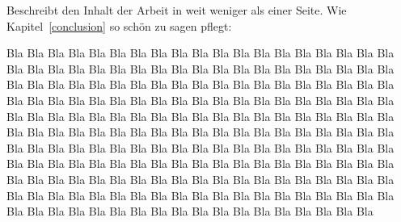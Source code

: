 Beschreibt den Inhalt der Arbeit in weit weniger als einer Seite.
Wie Kapitel~\ref{conclusion} so schön zu sagen pflegt: %

Bla Bla Bla Bla Bla Bla Bla Bla Bla Bla Bla Bla Bla Bla Bla Bla Bla Bla Bla Bla
Bla Bla Bla Bla Bla Bla Bla Bla Bla Bla Bla Bla Bla Bla Bla Bla Bla Bla Bla Bla
Bla Bla Bla Bla Bla Bla Bla Bla Bla Bla Bla Bla Bla Bla Bla Bla Bla Bla Bla Bla
Bla Bla Bla Bla Bla Bla Bla Bla Bla Bla Bla Bla Bla Bla Bla Bla Bla Bla Bla Bla
Bla Bla Bla Bla Bla Bla Bla Bla Bla Bla Bla Bla Bla Bla Bla Bla Bla Bla Bla Bla
Bla Bla Bla Bla Bla Bla Bla Bla Bla Bla Bla Bla Bla Bla Bla Bla Bla Bla Bla Bla
Bla Bla Bla Bla Bla Bla Bla Bla Bla Bla Bla Bla Bla Bla Bla Bla Bla Bla Bla Bla
Bla Bla Bla Bla Bla Bla Bla Bla Bla Bla Bla Bla Bla Bla Bla Bla Bla Bla Bla Bla
Bla Bla Bla Bla Bla Bla Bla Bla Bla Bla Bla Bla Bla Bla Bla Bla Bla Bla Bla Bla
Bla Bla Bla Bla Bla Bla Bla Bla Bla Bla Bla Bla Bla Bla Bla Bla Bla Bla Bla Bla
Bla Bla Bla Bla Bla Bla Bla Bla

%
%
